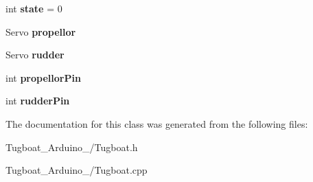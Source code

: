 \begin{DoxyCompactItemize}
\item 
int {\bfseries state} = 0\hypertarget{class_tugboat_a866387281ef68eb3a32a552bf6ab676e}{}\label{class_tugboat_a866387281ef68eb3a32a552bf6ab676e}

\item 
Servo {\bfseries propellor}\hypertarget{class_tugboat_a8f2c5235f5a70695b646a3c1284ea7ed}{}\label{class_tugboat_a8f2c5235f5a70695b646a3c1284ea7ed}

\item 
Servo {\bfseries rudder}\hypertarget{class_tugboat_a66a20255780959a095ccbc9b27346728}{}\label{class_tugboat_a66a20255780959a095ccbc9b27346728}

\item 
int {\bfseries propellor\+Pin}\hypertarget{class_tugboat_a9fa2052e18c687eddb4216aeccd5610c}{}\label{class_tugboat_a9fa2052e18c687eddb4216aeccd5610c}

\item 
int {\bfseries rudder\+Pin}\hypertarget{class_tugboat_a7b4287c6f09fab0faf86fc7a764b4343}{}\label{class_tugboat_a7b4287c6f09fab0faf86fc7a764b4343}

\end{DoxyCompactItemize}


The documentation for this class was generated from the following files\+:\begin{DoxyCompactItemize}
\item 
Tugboat\+\_\+\+Arduino\+\_/Tugboat.\+h\item 
Tugboat\+\_\+\+Arduino\+\_/Tugboat.\+cpp\end{DoxyCompactItemize}
